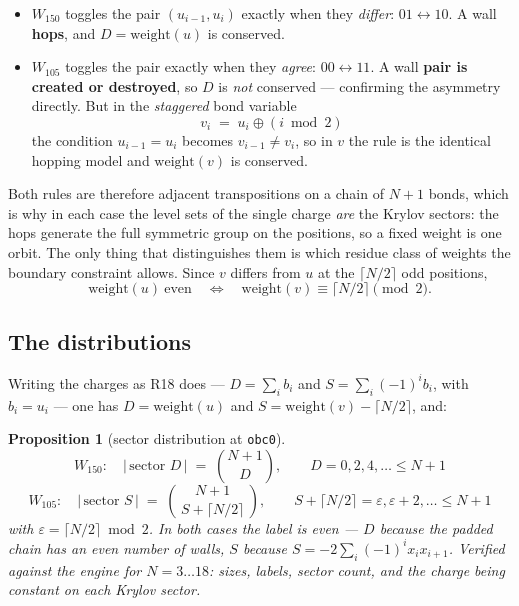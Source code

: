 \documentclass[11pt]{article}
\newcommand{\rt}[1]{\texttt{#1}}
\theoremstyle{plain}
\newtheorem{proposition}{Proposition}
\begin{document}
\begin{itemize}
\item $W_{150}$ toggles the pair $(u_{i-1}, u_i)$ exactly when they
\emph{differ}: $01 \leftrightarrow 10$. A wall \textbf{hops}, and
$D = \mathrm{weight}(u)$ is conserved.
\item $W_{105}$ toggles the pair exactly when they \emph{agree}:
$00 \leftrightarrow 11$. A wall \textbf{pair is created or destroyed}, so $D$ is
\emph{not} conserved --- confirming the asymmetry directly. But in the
\emph{staggered} bond variable
\[
v_i \;=\; u_i \oplus (i \bmod 2)
\]
the condition $u_{i-1} = u_i$ becomes $v_{i-1} \neq v_i$, so in $v$ the rule is
the identical hopping model and $\mathrm{weight}(v)$ is conserved.
\end{itemize}

\noindent Both rules are therefore adjacent transpositions on a chain of $N+1$
bonds, which is why in each case the level sets of the single charge \emph{are}
the Krylov sectors: the hops generate the full symmetric group on the positions,
so a fixed weight is one orbit. The only thing that distinguishes them is which
residue class of weights the boundary constraint allows. Since
$v$ differs from $u$ at the $\lceil N/2\rceil$ odd positions,
\[
\mathrm{weight}(u) \ \text{even}
\quad\Longleftrightarrow\quad
\mathrm{weight}(v) \equiv \lceil N/2 \rceil \pmod 2 .
\]

\subsection{The distributions}

Writing the charges as R18 does --- $D = \sum_i b_i$ and
$S = \sum_i (-1)^i b_i$, with $b_i = u_i$ --- one has $D = \mathrm{weight}(u)$
and $S = \mathrm{weight}(v) - \lceil N/2\rceil$, and:

\begin{proposition}[sector distribution at \rt{obc0}]
\label{prop:dist}
\[
\boxed{\;
W_{150}:\quad \bigl|\,\text{sector } D\,\bigr| \;=\; \binom{N+1}{D},
\qquad D = 0, 2, 4, \ldots \le N+1 \;}
\]
\[
\boxed{\;
W_{105}:\quad \bigl|\,\text{sector } S\,\bigr| \;=\;
\binom{N+1}{\,S + \lceil N/2\rceil\,},
\qquad S + \lceil N/2\rceil = \varepsilon, \varepsilon+2, \ldots \le N+1 \;}
\]
with $\varepsilon = \lceil N/2\rceil \bmod 2$. In both cases the label is even
--- $D$ because the padded chain has an even number of walls, $S$ because
$S = -2\sum_{i} (-1)^i x_i x_{i+1}$. Verified against the engine for
$N = 3 \ldots 18$: sizes, labels, sector count, and the charge being constant on
each Krylov sector.
\end{proposition}
\end{document}
